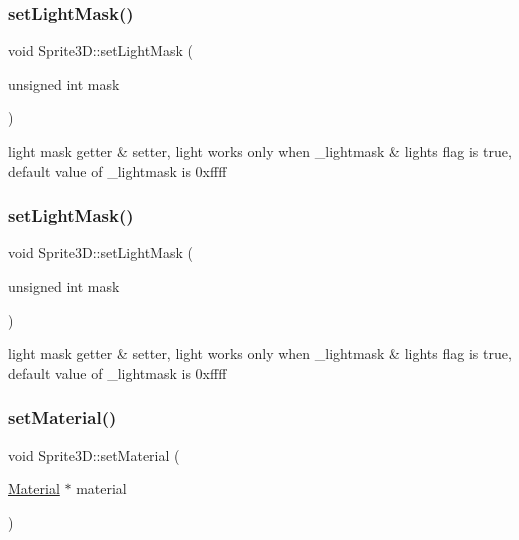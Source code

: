 \subsubsection{\texorpdfstring{set\+Light\+Mask()}{setLightMask()}\hspace{0.1cm}{\footnotesize\ttfamily [1/2]}}
{\footnotesize\ttfamily void Sprite3\+D\+::set\+Light\+Mask (\begin{DoxyParamCaption}\item[{unsigned int}]{mask }\end{DoxyParamCaption})\hspace{0.3cm}{\ttfamily [inline]}}

light mask getter \& setter, light works only when \+\_\+lightmask \& light\textquotesingle{}s flag is true, default value of \+\_\+lightmask is 0xffff \mbox{\label{classSprite3D_a0fa47c29a1b6e9cf7a0a2eaa45c1e43a}} 
\subsubsection{\texorpdfstring{set\+Light\+Mask()}{setLightMask()}\hspace{0.1cm}{\footnotesize\ttfamily [2/2]}}
{\footnotesize\ttfamily void Sprite3\+D\+::set\+Light\+Mask (\begin{DoxyParamCaption}\item[{unsigned int}]{mask }\end{DoxyParamCaption})\hspace{0.3cm}{\ttfamily [inline]}}

light mask getter \& setter, light works only when \+\_\+lightmask \& light\textquotesingle{}s flag is true, default value of \+\_\+lightmask is 0xffff \mbox{\label{classSprite3D_ac984a24d1e5fc0e9071eef14e5041c42}} 
\subsubsection{\texorpdfstring{set\+Material()}{setMaterial()}\hspace{0.1cm}{\footnotesize\ttfamily [1/4]}}
{\footnotesize\ttfamily void Sprite3\+D\+::set\+Material (\begin{DoxyParamCaption}\item[{\hyperlink{classMaterial}{Material} $\ast$}]{material }\end{DoxyParamCaption})}

